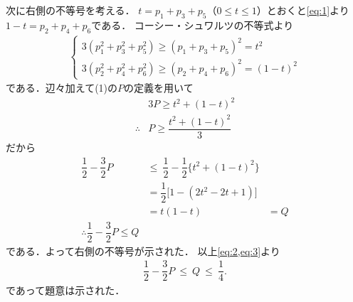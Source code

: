 \documentclass[../../main.tex]{subfiles}
\begin{document}
次に右側の不等号を考える．
$t=p_1+p_3+p_5$（$0\le t\le1$）とおくと\cref{eq:1}より$1-t=p_2+p_4+p_6$である．
コーシー・シュワルツの不等式より
\begin{align}
  \begin{cases}
    3(p_1^2+p_3^2+p_5^2) \ge (p_1+p_3+p_5)^2 = t^2 \\
    3(p_2^2+p_4^2+p_6^2) \ge (p_2+p_4+p_6)^2 = (1-t)^2
  \end{cases}
\end{align}
である．辺々加えて(1)の$P$の定義を用いて
\begin{align}
  & 3P \ge t^2 + (1-t)^2 \\
  \therefore
  & P\ge\dfrac{t^2+(1-t)^2}{3}
\end{align}
だから
\begin{align}
  \dfrac{1}{2}-\dfrac{3}{2}P\
  & \le\ \dfrac{1}{2}-\dfrac{1}{2}\bigl\{t^2+(1-t)^2\bigr\} \\
  & =\dfrac{1}{2}\bigl[1-(2t^2-2t+1)\bigr] \\
  & =t(1-t)
  & =Q \\
  \therefore
  \dfrac{1}{2}-\dfrac{3}{2}P \le Q \label{eq:3}
\end{align}
である．よって右側の不等号が示された．
以上\cref{eq:2,eq:3}より
\begin{align}
  \dfrac{1}{2}-\dfrac{3}{2}P\ \le\ Q\ \le\ \dfrac{1}{4}.
\end{align}
であって題意は示された．

\newpage
\end{document}
